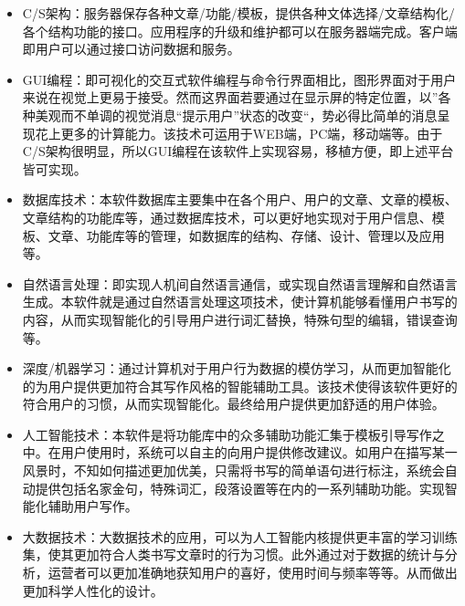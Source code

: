 \documentclass[10pt,letterpaper]{article}
\begin{document}
\begin{itemize}
\item 	C/S架构：服务器保存各种文章/功能/模板，提供各种文体选择/文章结构化/各个结构功能的接口。应用程序的升级和维护都可以在服务器端完成。客户端即用户可以通过接口访问数据和服务。
\item 	GUI编程：即可视化的交互式软件编程与命令行界面相比，图形界面对于用户来说在视觉上更易于接受。然而这界面若要通过在显示屏的特定位置，以”各种美观而不单调的视觉消息“提示用户”状态的改变“，势必得比简单的消息呈现花上更多的计算能力。该技术可运用于WEB端，PC端，移动端等。由于C/S架构很明显，所以GUI编程在该软件上实现容易，移植方便，即上述平台皆可实现。
\item 	数据库技术：本软件数据库主要集中在各个用户、用户的文章、文章的模板、文章结构的功能库等，通过数据库技术，可以更好地实现对于用户信息、模板、文章、功能库等的管理，如数据库的结构、存储、设计、管理以及应用等。
\item 	自然语言处理：即实现人机间自然语言通信，或实现自然语言理解和自然语言生成。本软件就是通过自然语言处理这项技术，使计算机能够看懂用户书写的内容，从而实现智能化的引导用户进行词汇替换，特殊句型的编辑，错误查询等。
\item 	深度/机器学习：通过计算机对于用户行为数据的模仿学习，从而更加智能化的为用户提供更加符合其写作风格的智能辅助工具。该技术使得该软件更好的符合用户的习惯，从而实现智能化。最终给用户提供更加舒适的用户体验。
\item 	人工智能技术：本软件是将功能库中的众多辅助功能汇集于模板引导写作之中。在用户使用时，系统可以自主的向用户提供修改建议。如用户在描写某一风景时，不知如何描述更加优美，只需将书写的简单语句进行标注，系统会自动提供包括名家金句，特殊词汇，段落设置等在内的一系列辅助功能。实现智能化辅助用户写作。
\item 	大数据技术：大数据技术的应用，可以为人工智能内核提供更丰富的学习训练集，使其更加符合人类书写文章时的行为习惯。此外通过对于数据的统计与分析，运营者可以更加准确地获知用户的喜好，使用时间与频率等等。从而做出更加科学人性化的设计。
\end{itemize}
\end{document}
